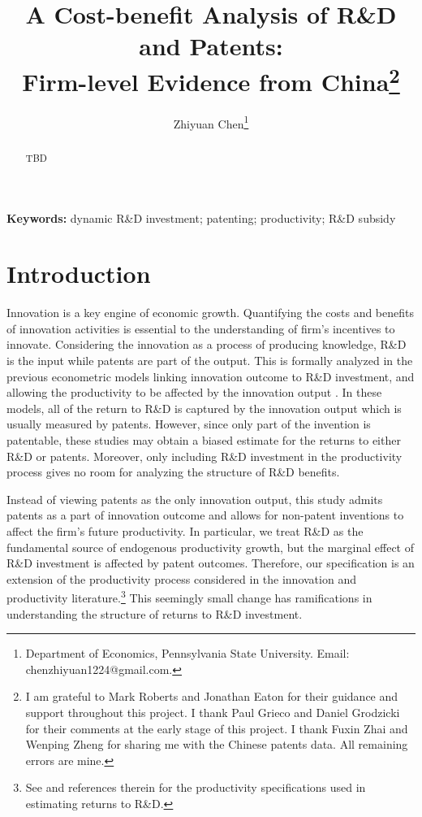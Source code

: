 \documentclass[11pt]{article}
\begin{document}
\title{\Large{}A Cost-benefit Analysis of R\&D and Patents:
\\ Firm-level Evidence from China\footnote{I am grateful to Mark Roberts and Jonathan Eaton for their guidance and support throughout this project. I thank Paul Grieco and Daniel Grodzicki for their comments at the early stage of this project. I thank Fuxin Zhai and Wenping Zheng for sharing me with the Chinese patents data. All remaining errors are mine. }}
\author{Zhiyuan Chen\footnote{Department of Economics, Pennsylvania State University. Email: chenzhiyuan1224@gmail.com.}}
\maketitle
\begin{abstract}
TBD
\end{abstract}
\textbf{Keywords: }dynamic R\&D investment; patenting; productivity; R\&D subsidy

\newpage

\section{Introduction}

Innovation is a key engine of economic growth. Quantifying the costs and benefits of innovation activities is essential to the understanding of firm's incentives to innovate. Considering the innovation as a process of producing knowledge, R\&D is the input while patents are part of the output. This is formally analyzed in the previous econometric models linking innovation outcome to R\&D investment, and allowing the productivity to be affected by the innovation output \citep{crepon1998research,mairesse2005,raymond2015}. In these models, all of the return to R\&D is captured by the innovation output which is usually measured by patents. However, since only part of the invention is patentable, these studies may obtain a biased estimate for the returns to either R\&D or patents. Moreover, only including R\&D investment in the productivity process gives no room for analyzing the structure of R\&D benefits.

Instead of viewing patents as the only innovation output, this study admits patents as a part of innovation outcome and allows for non-patent inventions to affect the firm's future productivity. In particular, we treat R\&D as the fundamental source of endogenous productivity growth, but the marginal effect of R\&D investment is affected by patent outcomes. Therefore, our specification is an extension of the productivity process considered in the innovation and productivity literature.\footnote{See \cite{hall2010handbook} and references therein for the productivity specifications used in estimating returns to R\&D.} This seemingly small change has ramifications in understanding the structure of returns to R\&D investment. 
\end{document}
